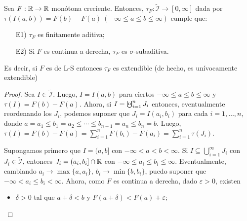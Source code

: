 \begin{theorem}
	Sea $F: \mathbb{R} \to \mathbb{R}$ monótona creciente. Entonces, $\tau_F: \widetilde{\mathcal{I}} \to [0,\infty]$ dada por $\tau(I(a,b)) = F(b) - F(a) \ (-\infty\leq a \leq b \leq \infty)$ cumple que:
	\begin{enumerate}
		\item[E1)] $\tau_F$ es finitamente aditiva;

		\item[E2)] Si $F$ es continua a derecha, $\tau_F$ es $\sigma$-subaditiva.
	\end{enumerate}
	Es decir, si $F$ es de L-S entonces $\tau_F$ es extendible (de hecho, es unívocamente extendible)
\end{theorem}
\begin{proof}
	\hfill{}\par
	 Sea $I \in \widetilde{\mathcal{I}}$. Luego, $I = I(a,b)$ para ciertos $-\infty\leq a \leq b \leq \infty$ y $\tau(I) = F(b) - F(a)$. Ahora, si $I = \textbigcupd_{i=1}^{n} J_i$ entonces, eventualmente reordenando los $J_i$, podemos suponer que $J_i = I(a_i,b_i)$ para cada $i = 1,\dots,n$, donde $a = a_1 \leq b_1 = a_2 \leq \cdots \leq b_{n-1} = a_n \leq b_n = b$. Luego, $\tau(I) = F(b) - F(a) = \sum_{i=1}^{n} F(b_i) - F(a_i) = \sum_{i=1}^{n} \tau(J_i)$.\par
	\medskip
	 Supongamos primero que $I = (a,b]$ con $-\infty < a < b < \infty$. Si $I \subseteq \bigcup_{i=1}^{\infty} J_i$ con $J_i \in \widetilde{\mathcal{I}}$, entonces $J_i = (a_i,b_i] \cap \mathbb{R}$ con $-\infty\leq a_i \leq b_i \leq \infty$. Eventualmente, cambiando $a_i \longrightarrow \max \{a,a_i\},\ b_i \longrightarrow \min \{b,b_i\}$, puedo suponer que $-\infty < a_i \leq b_i < \infty$. Ahora, como $F$ es continua a derecha, dado $\varepsilon > 0$, existen
	\begin{itemize}
		\item $\delta > 0$ tal que $a + \delta < b$ y $F(a + \delta) < F(a) + \varepsilon$;


\end{itemize}
\end{proof}
